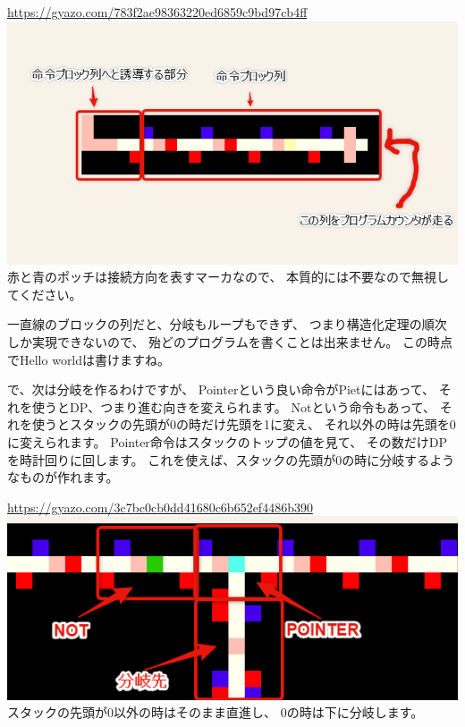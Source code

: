 \url{https://gyazo.com/783f2ae98363220ed6859c9bd97cb4ff}\\
\href{https://gyazo.com/783f2ae98363220ed6859c9bd97cb4ff}{\includegraphics[width=\textwidth]{images/783f2ae98363220ed6859c9bd97cb4ff.png}} \\
赤と青のポッチは接続方向を表すマーカなので、
本質的には不要なので無視してください。

一直線のブロックの列だと、分岐もループもできず、
つまり構造化定理の順次しか実現できないので、
殆どのプログラムを書くことは出来ません。 この時点でHello
worldは書けますね。

で、次は分岐を作るわけですが、 Pointerという良い命令がPietにはあって、
それを使うとDP、つまり進む向きを変えられます。 Notという命令もあって、
それを使うとスタックの先頭が0の時だけ先頭を1に変え、
それ以外の時は先頭を0に変えられます。
Pointer命令はスタックのトップの値を見て、
その数だけDPを時計回りに回します。
これを使えば、スタックの先頭が0の時に分岐するようなものが作れます。

\url{https://gyazo.com/3c7bc0cb0dd41680c6b652ef4486b390}\\
\href{https://gyazo.com/3c7bc0cb0dd41680c6b652ef4486b390}{\includegraphics[width=\textwidth]{images/3c7bc0cb0dd41680c6b652ef4486b390.png}} \\
スタックの先頭が0以外の時はそのまま直進し、
0の時は下に分岐します。

